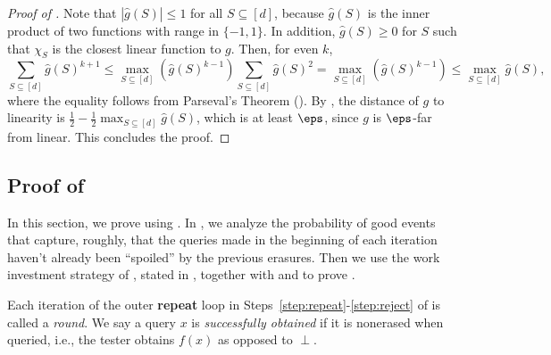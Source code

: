 \documentclass[11pt]{article}
\numberwithin{equation}{section}
\theoremstyle{definition}
\theoremstyle{plain}
\begin{document}
\begin{proof}[Proof of ]
  Note that $|\widehat{g}(S)| \leq 1$ for all $S \subseteq [d]$, because $\widehat{g}(S)$ is the inner product of two functions with range in $\{-1, 1\}$. In addition,  $\widehat{g}(S) \geq 0$ for $S$ such that $\chi_S$ is the closest linear function to $g$. Then, for even $k$,
  \begin{equation*}
      \sum_{S \subseteq [d]} \widehat{g}(S)^{k+1} \leq \max_{S \subseteq [d]} (\widehat{g}(S)^{k-1}) \sum_{S \subseteq [d]} \widehat{g}(S)^{2} = \max_{S \subseteq [d]} (\widehat{g}(S)^{k-1}) \leq \max_{S \subseteq [d]} \widehat{g}(S),
  \end{equation*}
where the equality follows from Parseval's Theorem (). By , the distance of $g$ to linearity is $\frac{1}{2} - \frac{1}{2} \max_{S \subseteq [d]} \widehat{g}(S)$, 
which is at least $\eps$, since $g$ is $\eps$-far from linear. This concludes the proof.
\end{proof}


\subsection{Proof of } \label{sec:linearity_proof}

In this section, we prove  using . In , we analyze the probability of good events that capture, roughly, that the queries made in the beginning of each iteration haven't already been ``spoiled'' by the previous erasures.
Then we use the work investment strategy of \cite{BermanRY14}, stated in , 
together with  and  to prove .  


Each iteration of the outer \textbf{repeat} loop in Steps~\ref{step:repeat}-\ref{step:reject} of  is called a {\em round}. We say a query $x$ is {\em successfully obtained} if it is nonerased when queried, i.e., the tester obtains $f(x)$ as opposed to $\perp$. 
\end{document}
